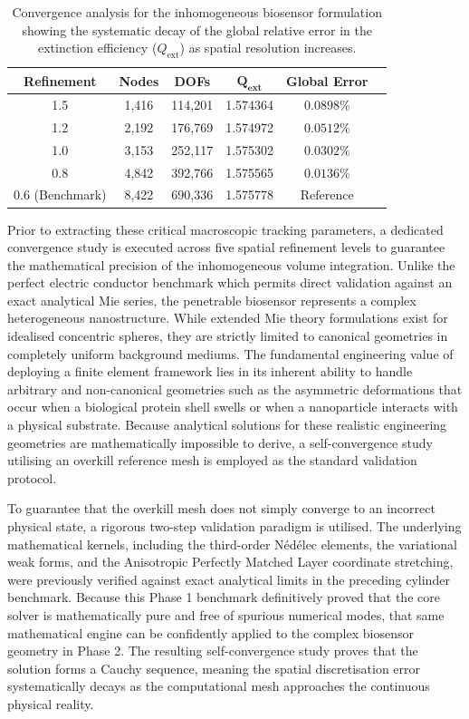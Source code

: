 \documentclass[class=report, crop=false]{standalone}
\begin{document}
\begin{table}[H]
\centering
\caption{Convergence analysis for the inhomogeneous biosensor formulation showing the systematic decay of the global relative error in the extinction efficiency ($Q_{\text{ext}}$) as spatial resolution increases.}
\label{tab:biosensor_convergence}
\begin{tabular}{cccccl}
\toprule
\textbf{Refinement} & \textbf{Nodes} & \textbf{DOFs} & $\bm{Q_{\text{ext}}}$ & \textbf{Global Error} \\
\midrule
1.5 & 1,416  & 114,201 & 1.574364 & $0.0898\%$ \\
1.2 & 2,192  & 176,769 & 1.574972 & $0.0512\%$ \\
1.0 & 3,153  & 252,117 & 1.575302 & $0.0302\%$ \\
0.8 & 4,842  & 392,766 & 1.575565 & $0.0136\%$ \\
0.6 (Benchmark) & 8,422 & 690,336 & 1.575778 & Reference \\
\bottomrule
\end{tabular}
\end{table}

Prior to extracting these critical macroscopic tracking parameters, a dedicated convergence study is executed across five spatial refinement levels to guarantee the mathematical precision of the inhomogeneous volume integration. Unlike the perfect electric conductor benchmark which permits direct validation against an exact analytical Mie series, the penetrable biosensor represents a complex heterogeneous nanostructure. While extended Mie theory formulations exist for idealised concentric spheres, they are strictly limited to canonical geometries in completely uniform background mediums. The fundamental engineering value of deploying a finite element framework lies in its inherent ability to handle arbitrary and non-canonical geometries such as the asymmetric deformations that occur when a biological protein shell swells or when a nanoparticle interacts with a physical substrate. Because analytical solutions for these realistic engineering geometries are mathematically impossible to derive, a self-convergence study utilising an overkill reference mesh is employed as the standard validation protocol.

\vspace{12pt}

To guarantee that the overkill mesh does not simply converge to an incorrect physical state, a rigorous two-step validation paradigm is utilised. The underlying mathematical kernels, including the third-order N\'{e}d\'{e}lec elements, the variational weak forms, and the Anisotropic Perfectly Matched Layer coordinate stretching, were previously verified against exact analytical limits in the preceding cylinder benchmark. Because this Phase 1 benchmark definitively proved that the core solver is mathematically pure and free of spurious numerical modes, that same mathematical engine can be confidently applied to the complex biosensor geometry in Phase 2. The resulting self-convergence study proves that the solution forms a Cauchy sequence, meaning the spatial discretisation error systematically decays as the computational mesh approaches the continuous physical reality.
\end{document}
